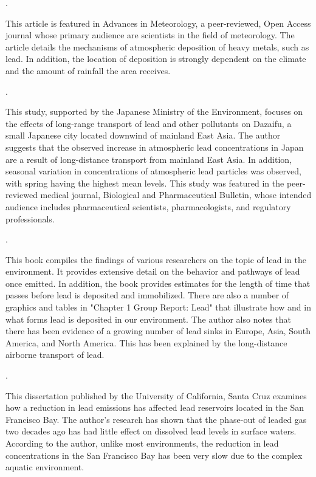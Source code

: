 \documentclass{article}
\begin{document}
\noindent {}.

\medskip

This article is featured in Advances in Meteorology, a peer-reviewed, Open Access journal whose primary audience are scientists in the field of meteorology. The article details the mechanisms of atmospheric deposition of heavy metals, such as lead. In addition, the location of deposition is strongly dependent on the climate and the amount of rainfall the area receives. 

\medskip

\noindent {}.

\medskip

This study, supported by the Japanese Ministry of the Environment, focuses on the effects of long-range transport of lead and other pollutants on Dazaifu, a small Japanese city located downwind of mainland East Asia. The author suggests that the observed increase in atmospheric lead concentrations in Japan are a result of long-distance transport from mainland East Asia. In addition, seasonal variation in concentrations of atmospheric lead particles was observed, with spring having the highest mean levels. This study was featured in the peer-reviewed medical journal, Biological and Pharmaceutical Bulletin, whose intended audience includes pharmaceutical scientists, pharmacologists, and regulatory professionals. 

\medskip

\noindent {}.

\medskip

This book compiles the findings of various researchers on the topic of lead in the environment. It provides extensive detail on the behavior and pathways of lead once emitted. In addition, the book provides estimates for the length of time that passes before lead is deposited and immobilized. There are also a number of graphics and tables in "Chapter 1 Group Report: Lead" that illustrate how and in what forms lead is deposited in our environment. The author also notes that there has been evidence of a growing number of lead sinks in Europe, Asia, South America, and North America. This has been explained by the long-distance airborne transport of lead.

\medskip

\noindent {}.

\medskip

This dissertation published by the University of California, Santa Cruz examines how a reduction in lead emissions has affected lead reservoirs located in the San Francisco Bay. The author’s research has shown that the phase-out of leaded gas two decades ago has had little effect on dissolved lead levels in surface waters. According to the author, unlike most environments, the reduction in lead concentrations in the San Francisco Bay has been very slow due to the complex aquatic environment.
\end{document}

